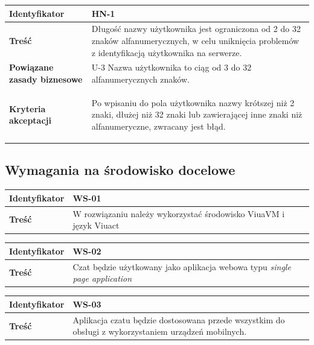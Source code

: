 \begin{tabular}{ | l | l | }
	\hline
		\textbf{Identyfikator} & 
		HN-1
		\\
		
	\hline
		\textbf{Treść} & \parbox[t]{13cm}{
			Długość nazwy użytkownika jest ograniczona od 2 do 32 znaków alfanumerycznych, w celu uniknięcia problemów z identyfikacją użytkownika na serwerze.
		}\\
		 
	\hline
		\parbox[t]{4cm}{\textbf{Powiązane zasady biznesowe}} & \parbox[t]{13cm}{
			U-3 Nazwa użytkownika to ciąg od 3 do 32 alfanumerycznych znaków.
		}\\
		
	\hline
		\parbox[t]{4cm}{\textbf{Kryteria akceptacji}} & \parbox[t]{13cm}{
			\begin{enumreq}
				\item Po wpisaniu do pola użytkownika nazwy krótszej niż 2 znaki, dłużej niż 32 znaki lub zawierającej inne znaki niż alfanumeryczne, zwracany jest błąd.
			\end{enumreq}
			}
		\\

	\hline
\end{tabular}

\subsection{Wymagania na środowisko docelowe}

\begin{tabular}{ | l | l | }
	\hline
		\textbf{Identyfikator} & 
	WS-01
		\\
		
	\hline
		\textbf{Treść} & \parbox[t]{13cm}{
			W rozwiązaniu należy wykorzystać środowisko ViuaVM i
			język Viuact
		}\\

	\hline
\end{tabular}

\begin{tabular}{ | l | l | }
	\hline
		\textbf{Identyfikator} & 
	WS-02
		\\
		
	\hline
		\textbf{Treść} & \parbox[t]{13cm}{
			Czat będzie użytkowany jako aplikacja webowa typu
			\textit{single page application}
		}\\

	\hline
\end{tabular}

\begin{tabular}{ | l | l | }
	\hline
		\textbf{Identyfikator} & 
	WS-03
		\\
		
	\hline
		\textbf{Treść} & \parbox[t]{13cm}{
			Aplikacja czatu będzie dostosowana przede wszystkim
			do obsługi z wykorzystaniem urządzeń mobilnych.
		}\\

	\hline
\end{tabular}

